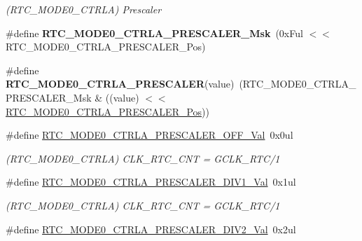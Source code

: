 \begin{DoxyCompactItemize}
\begin{DoxyCompactList}\small\item\em (R\+T\+C\+\_\+\+M\+O\+D\+E0\+\_\+\+C\+T\+R\+L\+A) Prescaler \end{DoxyCompactList}\item 
\hypertarget{group___s_a_m_l21___r_t_c_ga60d8e6506b228e2f7cea74c9e5c59088}{}\#define {\bfseries R\+T\+C\+\_\+\+M\+O\+D\+E0\+\_\+\+C\+T\+R\+L\+A\+\_\+\+P\+R\+E\+S\+C\+A\+L\+E\+R\+\_\+\+Msk}~(0x\+Ful $<$$<$ R\+T\+C\+\_\+\+M\+O\+D\+E0\+\_\+\+C\+T\+R\+L\+A\+\_\+\+P\+R\+E\+S\+C\+A\+L\+E\+R\+\_\+\+Pos)\label{group___s_a_m_l21___r_t_c_ga60d8e6506b228e2f7cea74c9e5c59088}

\item 
\hypertarget{group___s_a_m_l21___r_t_c_gaba395f2ef87e2ad5275f90405fd477c4}{}\#define {\bfseries R\+T\+C\+\_\+\+M\+O\+D\+E0\+\_\+\+C\+T\+R\+L\+A\+\_\+\+P\+R\+E\+S\+C\+A\+L\+E\+R}(value)~(R\+T\+C\+\_\+\+M\+O\+D\+E0\+\_\+\+C\+T\+R\+L\+A\+\_\+\+P\+R\+E\+S\+C\+A\+L\+E\+R\+\_\+\+Msk \& ((value) $<$$<$ \hyperlink{group___s_a_m_l21___r_t_c_ga0dbb76324e6c9c6d9391c96723e6e59b}{R\+T\+C\+\_\+\+M\+O\+D\+E0\+\_\+\+C\+T\+R\+L\+A\+\_\+\+P\+R\+E\+S\+C\+A\+L\+E\+R\+\_\+\+Pos}))\label{group___s_a_m_l21___r_t_c_gaba395f2ef87e2ad5275f90405fd477c4}

\item 
\hypertarget{group___s_a_m_l21___r_t_c_ga8d252b01683e5440e71ea8520409e234}{}\#define \hyperlink{group___s_a_m_l21___r_t_c_ga8d252b01683e5440e71ea8520409e234}{R\+T\+C\+\_\+\+M\+O\+D\+E0\+\_\+\+C\+T\+R\+L\+A\+\_\+\+P\+R\+E\+S\+C\+A\+L\+E\+R\+\_\+\+O\+F\+F\+\_\+\+Val}~0x0ul\label{group___s_a_m_l21___r_t_c_ga8d252b01683e5440e71ea8520409e234}

\begin{DoxyCompactList}\small\item\em (R\+T\+C\+\_\+\+M\+O\+D\+E0\+\_\+\+C\+T\+R\+L\+A) C\+L\+K\+\_\+\+R\+T\+C\+\_\+\+C\+N\+T = G\+C\+L\+K\+\_\+\+R\+T\+C/1 \end{DoxyCompactList}\item 
\hypertarget{group___s_a_m_l21___r_t_c_ga3368a55d0baa545619ccb1a6f1a0843a}{}\#define \hyperlink{group___s_a_m_l21___r_t_c_ga3368a55d0baa545619ccb1a6f1a0843a}{R\+T\+C\+\_\+\+M\+O\+D\+E0\+\_\+\+C\+T\+R\+L\+A\+\_\+\+P\+R\+E\+S\+C\+A\+L\+E\+R\+\_\+\+D\+I\+V1\+\_\+\+Val}~0x1ul\label{group___s_a_m_l21___r_t_c_ga3368a55d0baa545619ccb1a6f1a0843a}

\begin{DoxyCompactList}\small\item\em (R\+T\+C\+\_\+\+M\+O\+D\+E0\+\_\+\+C\+T\+R\+L\+A) C\+L\+K\+\_\+\+R\+T\+C\+\_\+\+C\+N\+T = G\+C\+L\+K\+\_\+\+R\+T\+C/1 \end{DoxyCompactList}\item 
\hypertarget{group___s_a_m_l21___r_t_c_ga114db7ddc2d209f1f98a13f185dcc0eb}{}\#define \hyperlink{group___s_a_m_l21___r_t_c_ga114db7ddc2d209f1f98a13f185dcc0eb}{R\+T\+C\+\_\+\+M\+O\+D\+E0\+\_\+\+C\+T\+R\+L\+A\+\_\+\+P\+R\+E\+S\+C\+A\+L\+E\+R\+\_\+\+D\+I\+V2\+\_\+\+Val}~0x2ul\label{group___s_a_m_l21___r_t_c_ga114db7ddc2d209f1f98a13f185dcc0eb}


\end{DoxyCompactItemize}
